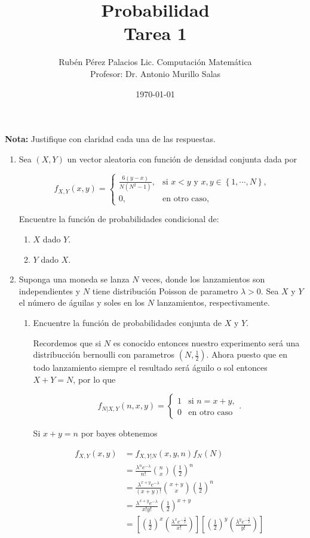 \documentclass[letterpaper]{article}
\title{Probabilidad \\ Tarea 1}
\author{Rubén Pérez Palacios Lic. Computación Matemática\\Profesor: Dr. Antonio Murillo Salas}
\date{\today}
\theoremstyle{definition}
\theoremstyle{lemathm}
\theoremstyle{lemathm}
\theoremstyle{lemathm}
\theoremstyle{lemademthm}
\newcommand{\pars}[1]{\left( #1 \right) }
\newcommand{\bracs}[1]{\left[ #1 \right] }
\newcommand{\set}[1]{\left \{ #1 \right\} }
\newcommand{\1}{\mathbbm{1}}
\begin{document}
	\maketitle

	\textbf{Nota:} Justifique con claridad cada una de las respuestas.

	\begin{enumerate}
		\item Sea $\pars{X,Y}$ un vector aleatoria con función de densidad conjunta dada por
		
		\[f_{X,Y}\pars{x,y} = \begin{cases}
			\frac{6\pars{y-x}}{N\pars{N^2-1}}, &\text{si $x < y$ y $x,y\in\set{1,\cdots,N}$},\\
			0, &\text{en otro caso},
		\end{cases}\]

		Encuentre la función de probabilidades condicional de:

		\begin{enumerate}
			\item $X$ dado $Y$.
			\item $Y$ dado $X$.
		\end{enumerate}

		\item Suponga una moneda se lanza $N$ veces, donde los lanzamientos son independientes y $N$ tiene distribución Poisson de parametro $\lambda > 0$. Sea $X$ y $Y$ el número de águilas y soles en los $N$ lanzamientos, respectivamente.
		
		\begin{enumerate}
			\item Encuentre la función de probabilidades conjunta de $X$ y $Y$.
			
			Recordemos que si $N$ es conocido entonces nuestro experimento será una distribucción bernoulli con parametros $\pars{N,\frac{1}{2}}$. Ahora puesto que en todo lanzamiento siempre el resultado será águilo o sol entonces $X+Y = N$, por lo que

			\[f_{N|X,Y}\pars{n,x,y} = \begin{cases}
				1 &\text{si $n = x+y$},\\
				0 &\text{en otro caso}
			\end{cases}.\]

			Si $x + y = n$ por bayes obtenemos

			\begin{align*}
				f_{X,Y}\pars{x,y} &= f_{X,Y|N}\pars{x,y,n}f_{N}\pars{N}\\
				&= \frac{\lambda^ne^{-\lambda}}{n!} \binom{n}{x}\pars{\frac{1}{2}}^n\\
				&= \frac{\lambda^{x+y}e^{-\lambda}}{\pars{x+y}!} \binom{x+y}{x}\pars{\frac{1}{2}}^n\\
				&= \frac{\lambda^{x+y}e^{-\lambda}}{x!y!} \pars{\frac{1}{2}}^{x+y}\\
				&= \bracs{\pars{\frac{1}{2}}^{x} \pars{\frac{\lambda^xe^{-\frac{\lambda}{2}}}{x!}}}\bracs{\pars{\frac{1}{2}}^{y} \pars{\frac{\lambda^ye^{-\frac{\lambda}{2}}}{y!}}}
			\end{align*}


\end{enumerate}
\end{enumerate}
\end{document}
